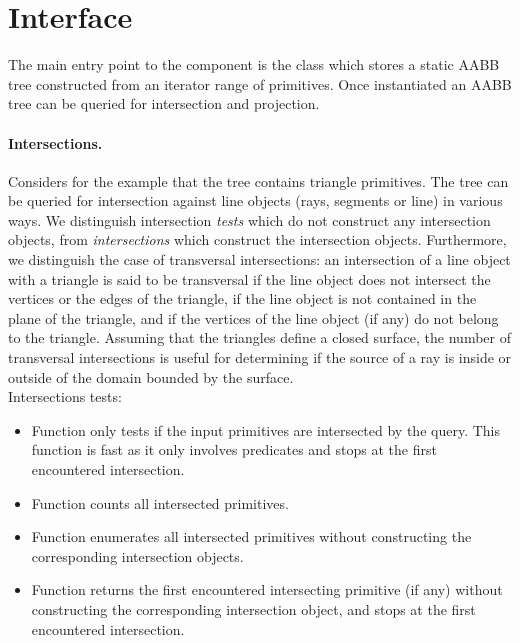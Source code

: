 \section{Interface}
\label{AABB_tree_section_interface}

The main entry point to the component is the class  which stores a static AABB tree constructed from an iterator range of primitives. Once instantiated an AABB tree can be queried for intersection and projection.


\paragraph{Intersections.} Considers for the example that the tree contains triangle primitives. The tree can be queried for intersection against line objects (rays, segments or line) in various ways. We distinguish intersection \emph{tests} which do not construct any intersection objects, from \emph{intersections} which construct the intersection objects. Furthermore, we distinguish the case of transversal intersections: an intersection of a line object with a triangle is said to be transversal if the line object does not intersect the vertices or the edges of the triangle, if the line object is not contained in the plane of the triangle, and if the vertices of the line object (if any) do not belong to the triangle. Assuming that the triangles define a closed surface, the number of transversal intersections is useful for determining if the source of a ray is inside or outside of the domain bounded by the surface.\\

Intersections tests:
\begin{itemize}
\item Function  only tests if the input primitives are intersected by the query. This function is fast as it only involves predicates and stops at the first encountered intersection.
\item Function  counts all intersected primitives.
\item Function  enumerates all intersected primitives without constructing the corresponding intersection objects.
\item Function  returns the first encountered intersecting primitive (if any) without constructing the corresponding intersection object, and stops at the first encountered intersection.
\end{itemize}

